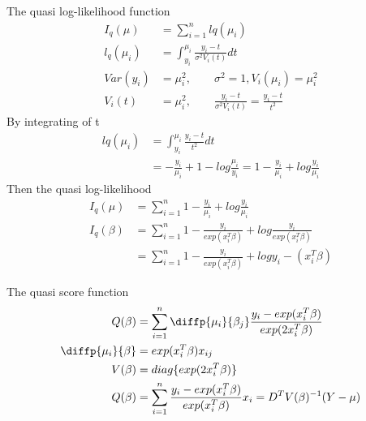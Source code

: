   The quasi log-likelihood function
\begin{align*}
	I_q(\mu) &= \sum_{i=1}^n lq(\mu_i)\\
	l_q(\mu_i) &=\int_{y_i}^{\mu_i} \frac{y_i- t}{\sigma^2 V_i (t)} dt\\
	Var(y_i) &= \mu_i^2,  \qquad \sigma^2 = 1, V_i(\mu_i) = \mu_i^2\\
	V_i (t) &= \mu_i^2, \qquad  \frac{y_i- t}{\sigma^2 V_i (t)} = \frac{y_i - t}{t^2}
\end{align*} 
By integrating of t
\begin{align*}
	lq(\mu_i) &= \int_{y_i}^{\mu_i} \frac{y_i - t}{t^2} dt\\
	&= -\frac{y_i}{\mu_i} + 1 -log \frac{\mu_i}{y_i} = 1- \frac{y_i}{\mu_i} + log \frac{y_i}{\mu_i}
\end{align*} 
Then the quasi log-likelihood
\begin{align*}
	I_q(\mu) &= \sum_{i=1}^n 1- \frac{y_i}{\mu_i} + log \frac{y_i}{\mu_i}\\
	I_q(\beta) &= \sum_{i=1}^n 1- \frac{y_i}{exp(x_i^T\beta)} + log \frac{y_i}{exp(x_i^T\beta)} \\
	&=  \sum_{i=1}^n 1- \frac{y_i}{exp(x_i^T\beta)} + log y_i - {(x_i^T\beta)} 
\end{align*} 

The quasi score function
\begin{align*}
	Q(\beta) &= \sum_{i=1}^n \diffp{\mu_i}{{\beta_j}} \frac{y_i - exp(x_i^T \beta)}{exp(2 x_i^T \beta)} \\
	\diffp{\mu_i}{{\beta}} &= exp( x_i^T \beta) x_{ij} \\
	V(\beta) &= diag \{ exp(2 x_i^T \beta) \} \\
	Q(\beta) &=  \sum_{i=1}^n  \frac{y_i - exp(x_i^T \beta)}{exp( x_i^T \beta)} x_{i} = D^T V(\beta)^{-1} (Y- \mu) 
\end{align*} 


